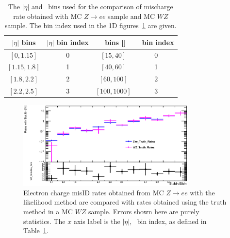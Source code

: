\begin{table}[htp]
\centering

\begin{tabular}{c|c||c|c}
	 \hline
	  $|\eta|$ bins & $|\eta|$ bin index   & \pt\ bins [\GeV] & \pt\ bin index \\
 	 \hline
	  $[0, 1.15]   $   & 0 	   &  $[15, 40]$ & 0 \\
	  $[1.15, 1.8] $   & 1 	   &  $[40, 60]$ & 1 \\
	  $[1.8, 2.2] $   & 2	   &  $[60, 100]$ & 2 \\
	  $[2.2, 2.5] $   & 3 	   &  $[100, 1000]$ & 3 \\

  \hline
\end{tabular}
\caption{The $|\eta|$ and \pt\ bins used for the comparison of mischarge
  rate obtained with MC $Z\to{}ee$ sample and MC $WZ$ sample. The bin index used in the 1D figures~\ref{fig:ChargeMisID_truthRate_Zee_WZ} are given.}
\label{tab:Etbin and Etabin of mis-charge rate for WZ comparisons}
\end{table}



 \begin{figure}[htp]
 \centering
 \includegraphics[width=0.8\textwidth]{figures/ChargeMisID/Validation_ChargeMisIDRates_PTvsEta_CompareSSRate.eps}
 \caption{Electron charge misID rates obtained from MC $Z\to{}ee$ with the likelihood method are compared with rates obtained using the truth method in a MC $WZ$ sample. Errors shown here are purely statistics. The $x$ axis label is
  the $|\eta|$, \pt\ bin index, as defined in Table~\ref{tab:Etbin and Etabin of mis-charge rate for WZ comparisons}.}
 \label{fig:ChargeMisID_truthRate_Zee_WZ}
 \end{figure}


